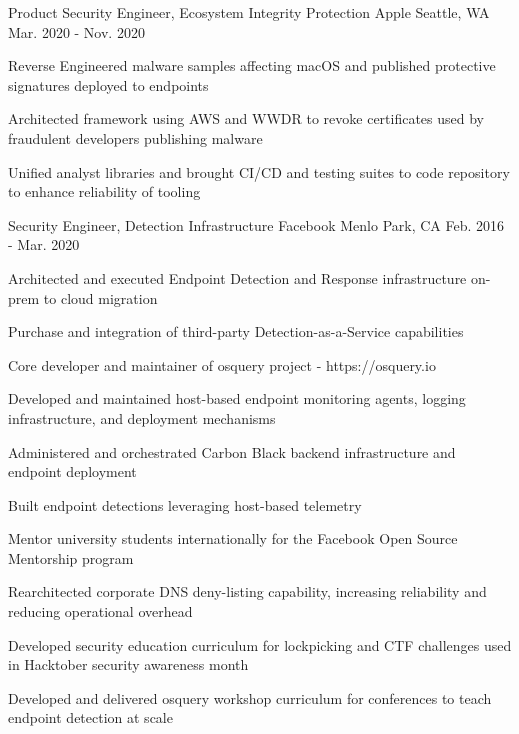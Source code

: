 \begin{cventries}

\cventry
{Product Security Engineer, Ecosystem Integrity Protection} %
{Apple} %
{Seattle, WA} %
{Mar. 2020 - Nov. 2020} %
{ %
\begin{cvitems}
\item {Reverse Engineered malware samples affecting macOS and published protective signatures deployed to endpoints}
\item {Architected framework using AWS and WWDR to revoke certificates used by fraudulent developers publishing malware}
\item {Unified analyst libraries and brought CI/CD and testing suites to code repository to enhance reliability of tooling}
\end{cvitems}
}


\cventry
{Security Engineer, Detection Infrastructure} %
{Facebook} %
{Menlo Park, CA} %
{Feb. 2016 - Mar. 2020} %
{ %
\begin{cvitems}
\item {Architected and executed Endpoint Detection and Response infrastructure on-prem to cloud migration}
\item {Purchase and integration of third-party Detection-as-a-Service capabilities}
\item {Core developer and maintainer of osquery project - https://osquery.io}
\item {Developed and maintained host-based endpoint monitoring agents, logging infrastructure, and deployment mechanisms}
\item {Administered and orchestrated Carbon Black backend infrastructure and endpoint deployment}
\item {Built endpoint detections leveraging host-based telemetry}
\item {Mentor university students internationally for the Facebook Open Source Mentorship program}
\item {Rearchitected corporate DNS deny-listing capability, increasing reliability and reducing operational overhead}
\item {Developed security education curriculum for lockpicking and CTF challenges used in Hacktober security awareness month}
\item {Developed and delivered osquery workshop curriculum for conferences to teach endpoint detection at scale}
\end{cvitems}
}


\end{cventries}

